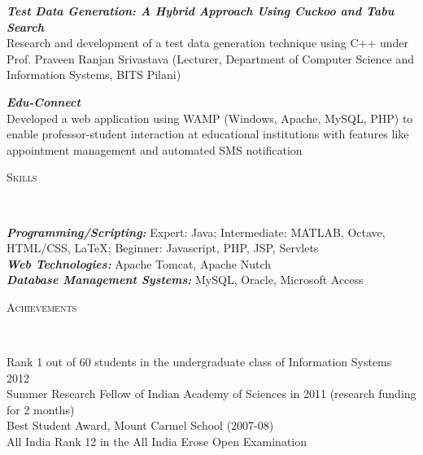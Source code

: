 \documentclass[11pt]{article}
\newenvironment{changemargin}[2]{%
  \begin{list}{}{%
    \setlength{\topsep}{0pt}%
    \setlength{\leftmargin}{#1}%
    \setlength{\rightmargin}{#2}%
    \setlength{\listparindent}{\parindent}%
    \setlength{\itemindent}{\parindent}%
    \setlength{\parsep}{\parskip}%
  }%
  \item[]}{\end{list}
}
\newcommand{\lineover}{
	\begin{changemargin}{-0.05in}{-0.05in}
		\vspace*{-8pt}
		\hrulefill \\
		\vspace*{-2pt}
	\end{changemargin}
}
\newcommand{\header}[1]{
	\begin{changemargin}{-0.5in}{-0.5in}
		\scshape{#1}\\
  	\lineover
	\end{changemargin}
}
\newenvironment{body} {
	\vspace*{-16pt}
	\begin{changemargin}{-0.25in}{-0.5in}
  }	
	{\end{changemargin}
}
\begin{document}
\begin{body}
	\vspace{14pt}
	\emph{\textbf{Test Data Generation: A Hybrid Approach Using Cuckoo and Tabu Search}} \\
	Research and development of a test data generation technique using C++ under Prof. Praveen Ranjan Srivastava (Lecturer, Department of Computer
Science and Information Systems, BITS Pilani)
	
	\medskip
	
	\emph{\textbf{Edu-Connect}} \\
	Developed a web application using WAMP (Windows, Apache, MySQL, PHP) to enable professor-student
interaction at educational institutions with features like appointment management and automated
SMS notification

\end{body}

\smallskip

\header{Skills}

\begin{body}
	\vspace{14pt}
	\emph{\textbf{Programming/Scripting:}}{} Expert: Java; Intermediate: MATLAB, Octave, HTML/CSS, LaTeX; Beginner: Javascript, PHP, JSP, Servlets \\
	\medskip
	\emph{\textbf{Web Technologies:}}{} Apache Tomcat, Apache Nutch \\
	\medskip
	\emph{\textbf{Database Management Systems:}}{} MySQL, Oracle, Microsoft Access
\end{body}

\smallskip

\header{Achievements}

\begin{body}
	\vspace{14pt}
	Rank 1 out of 60 students in the undergraduate class of Information Systems 2012 \\
	Summer Research Fellow of Indian Academy of Sciences in 2011 (research funding for 2 months) \\
	Best Student Award, Mount Carmel School (2007-08) \\
	All India Rank 12 in the All India Erose Open Examination \\
\end{body}
\end{document}
